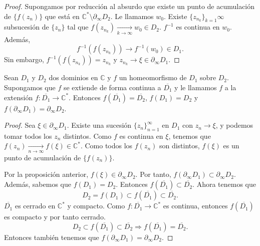 \begin{proof}
    Supongamos por reducción al absurdo que existe un punto de acumulación de $\{f(z_n)\}$ que está en $\mathbb{C}^\ast \setminus \partial_\infty D_2$.
    Le llamamos $w_0$.
    Existe $\{z_{n_k}\}_{k=1}\infty$ subsucesión de $\{z_n\}$ tal que $f(z_{n_k}) \xrightarrow[k \to \infty]{} w_0 \in D_2$.
    $f^{-1}$ es continua en $w_0$.
    Además,
    $$f^{-1}(f(z_{n_k})) \to f^{-1}(w_0) \in D_1.$$
    Sin embargo, $f^{-1}(f(z_{n_k})) = z_{n_k}$ y $z_{n_k} \to \xi \in \partial_\infty D_1$.
\end{proof}

\begin{proposition}
    Sean $D_1$ y $D_2$ dos dominios en $\mathbb{C}$ y $f$ un homeomorfismo de $D_1$ sobre $D_2$.
    Supongamos que $f$ se extiende de forma continua a $\overline{D_1}$ y le llamamos $f$ a la extensión $f: \overline{D_1} \to \mathbb{C}^\ast$.
    Entonces $f(\overline{D_1}) = \overline{D_2}$, $f(D_1) = D_2$ y $f(\partial_\infty D_1) = \partial_\infty D_2$.
\end{proposition}

\begin{proof}
    Sea $\xi \in \partial_\infty D_1$.
    Existe una sucesión $\{z_n\}_{n=1}^\infty$ en $D_1$ con $z_n \to \xi$, y podemos tomar todos los $z_n$ distintos.
    Como $f$ es continua en $\xi$, tenemos que $f(z_n) \xrightarrow[n \to \infty]{} f(\xi) \in \mathbb{C}^\ast$.
    Como todos los $f(z_n)$ son distintos, $f(\xi)$ es un punto de acumulación de $\{f(z_n)\}$.

    Por la proposición anterior, $f(\xi) \in \partial_\infty D_2$.
    Por tanto, $f(\partial_\infty D_1) \subset \partial_\infty D_2$.
    Además, sabemos que $f(D_1) = D_2$.
    Entonces $f(\overline{D_1}) \subset \overline{D_2}$.
    Ahora tenemos que
    $$D_2 = f(D_1) \subset f(\overline{D_1}) \subset \overline{D_2}.$$
    $\overline{D_1}$ es cerrado en $\mathbb{C}^\ast$ y compacto.
    Como $f: \overline{D_1} \to \mathbb{C}^\ast$ es continua, entonces $f(\overline{D_1})$ es compacto y por tanto cerrado.
    $$D_2 \subset f(\overline{D_1}) \subset \overline{D_2} \Rightarrow f(\overline{D_1}) = \overline{D_2}.$$
    Entonces también tenemos que $f(\partial_\infty D_1) = \partial_\infty D_2$.
\end{proof}

